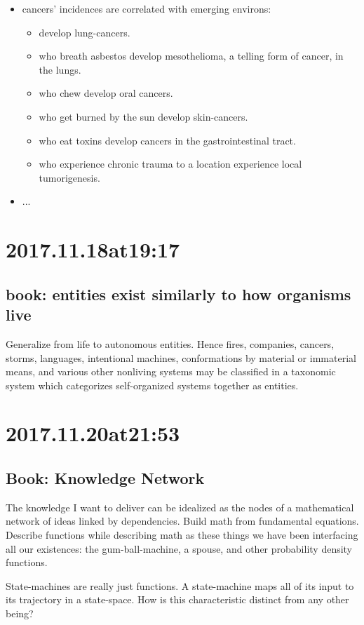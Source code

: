 \begin{enumerate}
\begin{enumerate}
\begin{itemize}
  \item cancers' incidences are correlated with emerging environs:
    \begin{itemize}
      \item develop lung-cancers.
      \item who breath asbestos develop mesothelioma, a telling form of cancer, in the lungs.
      \item who chew develop oral cancers.
      \item who get burned by the sun develop skin-cancers.
      \item who eat toxins develop cancers in the gastrointestinal tract.
      \item who experience chronic trauma to a location experience local tumorigenesis.
    \end{itemize}
  \item ...
\end{itemize}


\section*{ 2017.11.18at19:17 }
\subsection*{ book: entities exist similarly to how organisms live }
Generalize from life to autonomous entities. Hence fires, companies, cancers, storms, languages, intentional machines, conformations by material or immaterial means, and various other nonliving systems may be classified in a taxonomic system which categorizes self-organized systems together as entities.

\section*{ 2017.11.20at21:53 }
\subsection*{ Book: Knowledge Network }
The knowledge I want to deliver can be idealized as the nodes of a mathematical network of ideas linked by dependencies.
Build math from fundamental equations.
Describe functions while describing math as these things we have been interfacing all our existences: the gum-ball-machine, a spouse, and other probability density functions.

State-machines are really just functions.
A state-machine maps all of its input to its trajectory in a state-space.
How is this characteristic distinct from any other being?


\end{enumerate}
\end{enumerate}
